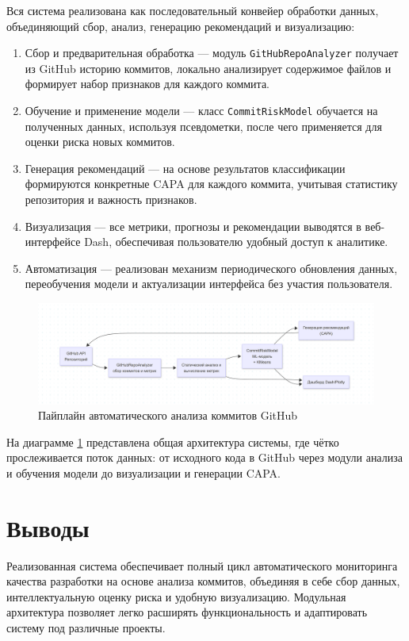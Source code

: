 Вся система реализована как последовательный конвейер обработки данных, объединяющий сбор, анализ, генерацию рекомендаций и визуализацию:

\begin{enumerate}
	\item Сбор и предварительная обработка — модуль \texttt{GitHubRepoAnalyzer} получает из GitHub историю коммитов, локально анализирует содержимое файлов и формирует набор признаков для каждого коммита.
	\item Обучение и применение модели — класс \texttt{CommitRiskModel} обучается на полученных данных, используя псевдометки, после чего применяется для оценки риска новых коммитов.
	\item Генерация рекомендаций — на основе результатов классификации формируются конкретные CAPA для каждого коммита, учитывая статистику репозитория и важность признаков.
	\item Визуализация — все метрики, прогнозы и рекомендации выводятся в веб-интерфейсе Dash, обеспечивая пользователю удобный доступ к аналитике.
	\item Автоматизация — реализован механизм периодического обновления данных, переобучения модели и актуализации интерфейса без участия пользователя.
\end{enumerate}

\begin{figure}[ht!]
	\centering
	\includegraphics[width=1.1\textwidth]{my_folder/images/mermaid.png}
	\caption{Пайплайн автоматического анализа коммитов GitHub}
	\label{fig:architecture1}
\end{figure}

На диаграмме \ref{fig:architecture1} представлена общая архитектура системы, где чётко прослеживается поток данных: от исходного кода в GitHub через модули анализа и обучения модели до визуализации и генерации CAPA.

\section{Выводы} \label{ch3:sec6}

Реализованная система обеспечивает полный цикл автоматического мониторинга качества разработки на основе анализа коммитов, объединяя в себе сбор данных, интеллектуальную оценку риска и удобную визуализацию. Модульная архитектура позволяет легко расширять функциональность и адаптировать систему под различные проекты.
